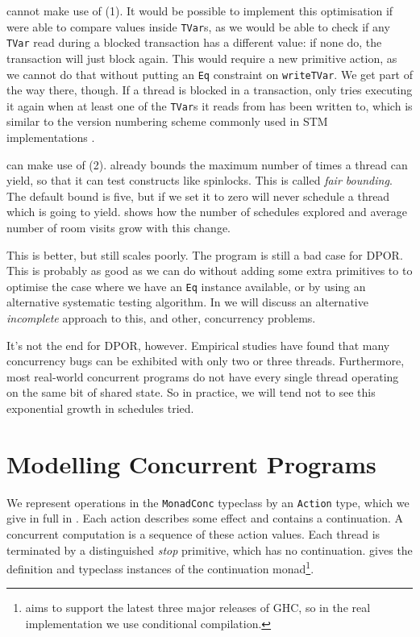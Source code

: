 \dejafu{} cannot make use of (1).  It would be possible to implement
this optimisation if \dejafu{} were able to compare values inside
\verb|TVar|s, as we would be able to check if any \verb|TVar| read
during a blocked transaction has a different value: if none do, the
transaction will just block again.  This would require a new primitive
action, as we cannot do that without putting an \verb|Eq| constraint
on \verb|writeTVar|.  We get part of the way there, though.  If a
thread is blocked in a transaction, \dejafu{} only tries executing it
again when at least one of the \verb|TVar|s it reads from has been
written to, which is similar to the version numbering scheme commonly
used in STM implementations \parencite{shavit1995}.

\dejafu{} can make use of (2).  \dejafu{} already bounds the maximum
number of times a thread can yield, so that it can test constructs
like spinlocks.  This is called \emph{fair bounding}.  The default
bound is five, but if we set it to zero \dejafu{} will never schedule
a thread which is going to yield.   shows how the
number of schedules explored and average number of room visits grow
with this change.

This is better, but still scales poorly.  The program is still a bad
case for DPOR.  This is probably as good as we can do without adding
some extra primitives to \dejafu{} to optimise the case where we have
an \verb|Eq| instance available, or by using an alternative systematic
testing algorithm.  In  we will discuss an
alternative \emph{incomplete} approach to this, and other, concurrency
problems.

It's not the end for DPOR, however.  Empirical
studies \parencite{thomson2014} have found that many concurrency bugs can be
exhibited with only two or three threads.  Furthermore, most
real-world concurrent programs do not have every single thread
operating on the same bit of shared state.  So in practice, we will
tend not to see this exponential growth in schedules tried.

\section{Modelling Concurrent Programs}
\label{sec:dejafu-execution}

We represent operations in the \verb|MonadConc| typeclass by an
\verb|Action| type, which we give in full in
.  Each action describes some effect and
contains a continuation.  A concurrent computation is a sequence of
these action values.  Each thread is terminated by a distinguished
\emph{stop} primitive, which has no continuation.   gives
the definition and typeclass instances of the \dejafu{} continuation
monad\footnote{\dejafu{} aims to support the latest three major
  releases of GHC, so in the real implementation we use conditional
  compilation.}.

